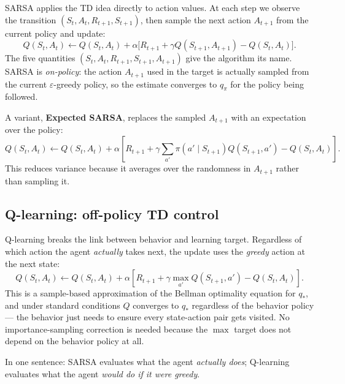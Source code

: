 \documentclass[11pt, oneside]{book}
\newcommand{\qstar}{q_{*}}               %
\begin{document}
SARSA applies the TD idea directly to action values.
At each step we observe the transition $(S_t, A_t, R_{t+1}, S_{t+1})$,
then sample the next action $A_{t+1}$ from the current policy and update:
\[
  Q(S_t,A_t) \leftarrow Q(S_t,A_t) + \alpha\bigl[R_{t+1} + \gamma Q(S_{t+1},A_{t+1}) - Q(S_t,A_t)\bigr].
\]
The five quantities $(S_t, A_t, R_{t+1}, S_{t+1}, A_{t+1})$ give the algorithm
its name.
SARSA is \emph{on-policy}: the action $A_{t+1}$ used in the target is actually
sampled from the current $\varepsilon$-greedy policy, so the estimate converges
to $q_\pi$ for the policy being followed.

A variant, \textbf{Expected SARSA}, replaces the sampled $A_{t+1}$ with an
expectation over the policy:
\[
  Q(S_t,A_t) \leftarrow Q(S_t,A_t)
  + \alpha\!\left[R_{t+1} + \gamma\sum_{a'}\pi(a'\mid S_{t+1})Q(S_{t+1},a') - Q(S_t,A_t)\right].
\]
This reduces variance because it averages over the randomness in $A_{t+1}$
rather than sampling it.

\subsection{Q-learning: off-policy TD control}

Q-learning breaks the link between behavior and learning target.
Regardless of which action the agent \emph{actually} takes next, the update uses
the \emph{greedy} action at the next state:
\[
  Q(S_t,A_t) \leftarrow Q(S_t,A_t)
  + \alpha\!\left[R_{t+1} + \gamma\max_{a'} Q(S_{t+1},a') - Q(S_t,A_t)\right].
\]
This is a sample-based approximation of the Bellman optimality equation for $\qstar$,
and under standard conditions $Q$ converges to $\qstar$ regardless of the behavior
policy --- the behavior just needs to ensure every state-action pair gets visited.
No importance-sampling correction is needed because the $\max$ target does not
depend on the behavior policy at all.

In one sentence: SARSA evaluates what the agent \emph{actually does}; Q-learning
evaluates what the agent \emph{would do if it were greedy}.
\end{document}
